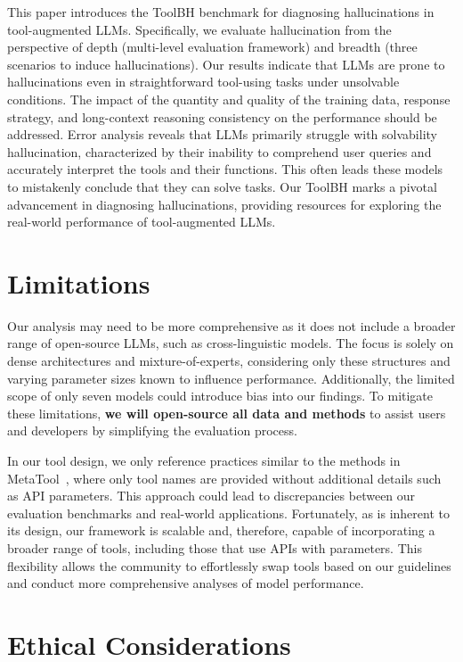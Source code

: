 \documentclass[11pt]{article}
\newcommand{\benchname}{ToolBH\xspace}
\begin{document}
This paper introduces the \benchname benchmark for diagnosing hallucinations in tool-augmented LLMs.
Specifically, we evaluate hallucination from the perspective of depth (multi-level evaluation framework) and breadth (three scenarios to induce hallucinations).
Our results indicate that LLMs are prone to hallucinations even in straightforward tool-using tasks under unsolvable conditions. 
The impact of the quantity and quality of the training data, response strategy, and long-context reasoning consistency on the performance should be addressed.
Error analysis reveals that LLMs primarily struggle with solvability hallucination, characterized by their inability to comprehend user queries and accurately interpret the tools and their functions. 
This often leads these models to mistakenly conclude that they can solve tasks.
Our \benchname marks a pivotal advancement in diagnosing hallucinations, providing resources for exploring the real-world performance of tool-augmented LLMs.

\section*{Limitations}

Our analysis may need to be more comprehensive as it does not include a broader range of open-source LLMs, such as cross-linguistic models. 
The focus is solely on dense architectures and mixture-of-experts, considering only these structures and varying parameter sizes known to influence performance.
Additionally, the limited scope of only seven models could introduce bias into our findings.  
To mitigate these limitations, \textbf{we will open-source all data and methods} to assist users and developers by simplifying the evaluation process.

In our tool design, we only reference practices similar to the methods in MetaTool~\cite{DBLP:journals/corr/abs-2310-03128@metatool}, where only tool names are provided without additional details such as API parameters. 
This approach could lead to discrepancies between our evaluation benchmarks and real-world applications. 
Fortunately, as is inherent to its design, our framework is scalable and, therefore, capable of incorporating a broader range of tools, including those that use APIs with parameters.
This flexibility allows the community to effortlessly swap tools based on our guidelines and conduct more comprehensive analyses of model performance.

\section*{Ethical Considerations}
\end{document}

